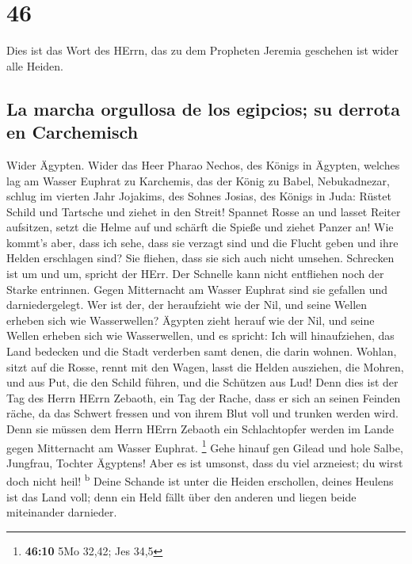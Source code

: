 \hypertarget{section-45}{%
\section{46}\label{section-45}}

 Dies ist das Wort des HErrn, das zu dem Propheten Jeremia
geschehen ist wider alle Heiden.

\hypertarget{la-marcha-orgullosa-de-los-egipcios-su-derrota-en-carchemisch}{%
\subsection{La marcha orgullosa de los egipcios; su derrota en
Carchemisch}\label{la-marcha-orgullosa-de-los-egipcios-su-derrota-en-carchemisch}}

 Wider Ägypten. Wider das Heer Pharao Nechos, des Königs
in Ägypten, welches lag am Wasser Euphrat zu Karchemis, das der König zu
Babel, Nebukadnezar, schlug im vierten Jahr Jojakims, des Sohnes Josias,
des Königs in Juda:  Rüstet Schild und Tartsche und ziehet
in den Streit!  Spannet Rosse an und lasset Reiter
aufsitzen, setzt die Helme auf und schärft die Spieße und ziehet Panzer
an!  Wie kommt's aber, dass ich sehe, dass sie verzagt
sind und die Flucht geben und ihre Helden erschlagen sind? Sie fliehen,
dass sie sich auch nicht umsehen. Schrecken ist um und um, spricht der
HErr.  Der Schnelle kann nicht entfliehen noch der Starke
entrinnen. Gegen Mitternacht am Wasser Euphrat sind sie gefallen und
darniedergelegt.  Wer ist der, der heraufzieht wie der
Nil, und seine Wellen erheben sich wie Wasserwellen? 
Ägypten zieht herauf wie der Nil, und seine Wellen erheben sich wie
Wasserwellen, und es spricht: Ich will hinaufziehen, das Land bedecken
und die Stadt verderben samt denen, die darin wohnen. 
Wohlan, sitzt auf die Rosse, rennt mit den Wagen, lasst die Helden
ausziehen, die Mohren, und aus Put, die den Schild führen, und die
Schützen aus Lud!  Denn dies ist der Tag des Herrn HErrn
Zebaoth, ein Tag der Rache, dass er sich an seinen Feinden räche, da das
Schwert fressen und von ihrem Blut voll und trunken werden wird. Denn
sie müssen dem Herrn HErrn Zebaoth ein Schlachtopfer werden im Lande
gegen Mitternacht am Wasser Euphrat. \footnote{\textbf{46:10} 5Mo 32,42;
  Jes 34,5}  Gehe hinauf gen Gilead und hole Salbe,
Jungfrau, Tochter Ägyptens! Aber es ist umsonst, dass du viel arzneiest;
du wirst doch nicht heil! \textsuperscript{b}  Deine
Schande ist unter die Heiden erschollen, deines Heulens ist das Land
voll; denn ein Held fällt über den anderen und liegen beide miteinander
darnieder.

